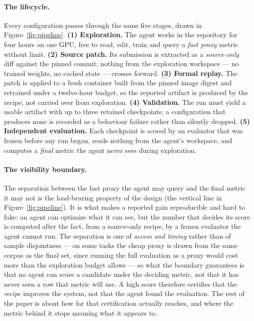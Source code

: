 \paragraph{The lifecycle.} Every configuration passes through the same five stages, drawn in
Figure~\ref{fig:pipeline}. \textbf{(1) Exploration.} The agent works in the repository for four
hours on one GPU, free to read, edit, train and query a \emph{fast proxy} metric without limit.
\textbf{(2) Source patch.} Its submission is extracted as a \emph{source-only} diff against the
pinned commit; nothing from the exploration workspace --- no trained weights, no cached state ---
crosses forward. \textbf{(3) Formal replay.} The patch is applied to a fresh container built from
the pinned image digest and retrained under a twelve-hour budget, so the reported artifact is
produced by the recipe, not carried over from exploration. \textbf{(4) Validation.} The run must
yield a usable artifact with up to three retained checkpoints; a configuration that produces none
is recorded as a behaviour failure rather than silently dropped. \textbf{(5) Independent
evaluation.} Each checkpoint is scored by an evaluator that was frozen before any run began, reads
nothing from the agent's workspace, and computes a \emph{final} metric the agent never sees during
exploration.

\paragraph{The visibility boundary.} The separation between the fast proxy the agent may query and
the final metric it may not is the load-bearing property of the design (the vertical line in
Figure~\ref{fig:pipeline}). It is what makes a reported gain reproducible and hard to fake: an agent
can optimize what it can see, but the number that decides its score is computed after the fact, from
a source-only recipe, by a frozen evaluator the agent cannot run. The separation is one of
\emph{access and timing} rather than of sample disjointness --- on some tasks the cheap proxy is
drawn from the same corpus as the final set, since running the full evaluation as a proxy would cost
more than the exploration budget allows --- so what the boundary guarantees is that no agent can
score a candidate under the deciding metric, not that it has never seen a row that metric will use. A high score therefore certifies
that the \emph{recipe} improves the system, not that the agent found the evaluation. The rest of
the paper is about how far that certification actually reaches, and where the metric behind it stops
meaning what it appears to.

